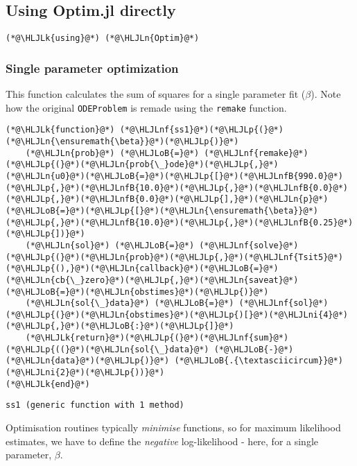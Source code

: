 \documentclass[12pt,a4paper]{article}
\newcommand{\HLJLk}[1]{\textcolor[RGB]{148,91,176}{\textbf{#1}}}
\newcommand{\HLJLn}[1]{#1}
\newcommand{\HLJLnf}[1]{\textcolor[RGB]{66,102,213}{#1}}
\newcommand{\HLJLnfB}[1]{\textcolor[RGB]{59,151,46}{#1}}
\newcommand{\HLJLni}[1]{\textcolor[RGB]{59,151,46}{#1}}
\newcommand{\HLJLoB}[1]{\textcolor[RGB]{102,102,102}{\textbf{#1}}}
\newcommand{\HLJLp}[1]{#1}
\begin{document}
\subsection{Using Optim.jl directly}

\begin{lstlisting}
(*@\HLJLk{using}@*) (*@\HLJLn{Optim}@*)
\end{lstlisting}


\subsubsection{Single parameter optimization}
This function calculates the sum of squares for a single parameter fit (\ensuremath{\beta}). Note how the original \texttt{ODEProblem} is remade using the \texttt{remake} function.


\begin{lstlisting}
(*@\HLJLk{function}@*) (*@\HLJLnf{ss1}@*)(*@\HLJLp{(}@*)(*@\HLJLn{\ensuremath{\beta}}@*)(*@\HLJLp{)}@*)
    (*@\HLJLn{prob}@*) (*@\HLJLoB{=}@*) (*@\HLJLnf{remake}@*)(*@\HLJLp{(}@*)(*@\HLJLn{prob{\_}ode}@*)(*@\HLJLp{,}@*)(*@\HLJLn{u0}@*)(*@\HLJLoB{=}@*)(*@\HLJLp{[}@*)(*@\HLJLnfB{990.0}@*)(*@\HLJLp{,}@*)(*@\HLJLnfB{10.0}@*)(*@\HLJLp{,}@*)(*@\HLJLnfB{0.0}@*)(*@\HLJLp{,}@*)(*@\HLJLnfB{0.0}@*)(*@\HLJLp{],}@*)(*@\HLJLn{p}@*)(*@\HLJLoB{=}@*)(*@\HLJLp{[}@*)(*@\HLJLn{\ensuremath{\beta}}@*)(*@\HLJLp{,}@*)(*@\HLJLnfB{10.0}@*)(*@\HLJLp{,}@*)(*@\HLJLnfB{0.25}@*)(*@\HLJLp{])}@*)
    (*@\HLJLn{sol}@*) (*@\HLJLoB{=}@*) (*@\HLJLnf{solve}@*)(*@\HLJLp{(}@*)(*@\HLJLn{prob}@*)(*@\HLJLp{,}@*)(*@\HLJLnf{Tsit5}@*)(*@\HLJLp{(),}@*)(*@\HLJLn{callback}@*)(*@\HLJLoB{=}@*)(*@\HLJLn{cb{\_}zero}@*)(*@\HLJLp{,}@*)(*@\HLJLn{saveat}@*)(*@\HLJLoB{=}@*)(*@\HLJLn{obstimes}@*)(*@\HLJLp{)}@*)
    (*@\HLJLn{sol{\_}data}@*) (*@\HLJLoB{=}@*) (*@\HLJLnf{sol}@*)(*@\HLJLp{(}@*)(*@\HLJLn{obstimes}@*)(*@\HLJLp{)[}@*)(*@\HLJLni{4}@*)(*@\HLJLp{,}@*)(*@\HLJLoB{:}@*)(*@\HLJLp{]}@*)
    (*@\HLJLk{return}@*)(*@\HLJLp{(}@*)(*@\HLJLnf{sum}@*)(*@\HLJLp{((}@*)(*@\HLJLn{sol{\_}data}@*) (*@\HLJLoB{-}@*) (*@\HLJLn{data}@*)(*@\HLJLp{)}@*) (*@\HLJLoB{.{\textasciicircum}}@*)(*@\HLJLni{2}@*)(*@\HLJLp{))}@*)
(*@\HLJLk{end}@*)
\end{lstlisting}

\begin{lstlisting}
ss1 (generic function with 1 method)
\end{lstlisting}


Optimisation routines typically \emph{minimise} functions, so for maximum likelihood estimates, we have to define the \emph{negative} log-likelihood - here, for a single parameter, \ensuremath{\beta}.
\end{document}
